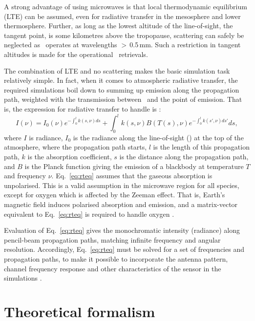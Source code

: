 A strong advantage of using microwaves is that local thermodynamic equilibrium
(LTE) can be assumed, even for radiative transfer in the mesosphere and lower
thermosphere. Further, as long as the lowest altitude of the line-of-sight, the
tangent point, is some kilometres above the tropopause, scattering can safely
be neglected as \smr\ operates at wavelengths $>$\,0.5\,mm. Such a restriction in
tangent altitudes is made for the operational \smr\ retrievals. 

The combination of LTE and no scattering makes the basic simulation task
relatively simple. In fact, when it comes to atmospheric radiative transfer,
the required simulations boil down to summing up emission along the propagation
path, weighted with the transmission between \smr\ and the point of emission.
That is, the expression for radiative transfer to handle is \citep[see
e.g.][Eq.~50]{chandrasekhar:60}:
\begin{equation}
  \label{eq:rteq}
     I(\nu) = I_0(\nu)e^{-\int^l_0{k(s,\nu)ds}} + 
     \int^l_0{k(s,\nu)B(T(s),\nu) e^{-\int^l_0{k(s',\nu)ds'}} ds},
\end{equation}
where $I$ is radiance, $I_0$ is the radiance along the line-of-sight (\LOS) at
the top of the atmosphere, where the propagation path starts, $l$ is the length
of this propagation path, $k$ is the absorption coefficient, $s$ is the
distance along the propagation path, and $B$ is the Planck function giving the
emission of a blackbody at temperature $T$ and frequency $\nu$.
Eq.~\ref{eq:rteq} assumes that the gaseous absorption is unpolarised. This is a
valid assumption in the microwave region for all species, except for oxygen which
is affected by the Zeeman effect. That is, Earth's magnetic field induces
polarised absorption and emission, and a matrix-vector equivalent to
Eq.~\ref{eq:rteq} is required to handle oxygen \citep[see
e.g.][]{larsson:zeema:14}.

Evaluation of Eq.~\ref{eq:rteq} gives the monochromatic intensity (radiance)
along pencil-beam propagation paths, matching infinite frequency and angular
resolution. Accordingly, Eq.~\ref{eq:rteq} must be solved for a set of
frequencies and propagation paths, to make it possible to incorporate the
antenna pattern, channel frequency response and other characteristics of the
sensor in the simulations \citep[see e.g.][]{eriksson:studi:02,read2006clear}.


\section{Theoretical formalism}
\label{sec:formalism}

